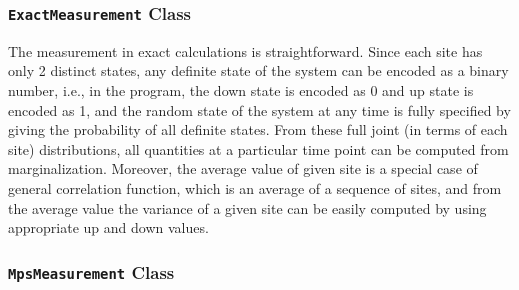 \documentclass[english]{article}
\begin{document}
\subsubsection{\texttt{ExactMeasurement} Class}

The measurement in exact calculations is straightforward. Since each site has only 2 distinct states, any definite state of the system can be encoded as a binary number, i.e., in  the program, the down state is encoded as 0 and up state is encoded as 1, and the random state of the system at any time is fully specified by giving the probability of all definite states. From these full joint (in terms of each site) distributions, all quantities at a particular time point can be computed from marginalization. Moreover, the average value of given site is a special case of general correlation function, which is an average of a sequence of sites, and from the average value the variance of a given site can be easily computed by using appropriate up and down values.



\subsubsection{\texttt{MpsMeasurement} Class}
\end{document}
